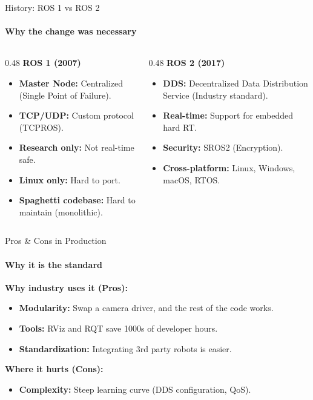 \documentclass[aspectratio=169]{beamer}
\begin{document}
\begin{frame}[t]{History: ROS 1 vs ROS 2}
    \framesubtitle{Why the change was necessary}
    \begin{columns}[T,onlytextwidth]
        \begin{column}{0.48\textwidth}
            \textbf{ROS 1 (2007)}
            \begin{itemize}
                \item \textbf{Master Node:} Centralized (Single Point of Failure).
                \item \textbf{TCP/UDP:} Custom protocol (TCPROS).
                \item \textbf{Research only:} Not real-time safe.
                \item \textbf{Linux only:} Hard to port.
                \item \textbf{Spaghetti codebase:} Hard to maintain (monolithic).
            \end{itemize}
        \end{column}
        \begin{column}{0.48\textwidth}
            \textbf{ROS 2 (2017)}
            \begin{itemize}
                \item \textbf{DDS:} Decentralized Data Distribution Service (Industry standard).
                \item \textbf{Real-time:} Support for embedded hard RT.
                \item \textbf{Security:} SROS2 (Encryption).
                \item \textbf{Cross-platform:} Linux, Windows, macOS, RTOS.
            \end{itemize}
        \end{column}
    \end{columns}
\end{frame}

\begin{frame}{Pros \& Cons in Production}
    \framesubtitle{Why it is the standard}
    \textbf{Why industry uses it (Pros):}
    \begin{itemize}
        \item \textbf{Modularity:} Swap a camera driver, and the rest of the code works.
        \item \textbf{Tools:} RViz and RQT save 1000s of developer hours.
        \item \textbf{Standardization:} Integrating 3rd party robots is easier.
    \end{itemize}

    \textbf{Where it hurts (Cons):}
    \begin{itemize}
        \item \textbf{Complexity:} Steep learning curve (DDS configuration, QoS).
    \end{itemize}
\end{frame}
\end{document}
